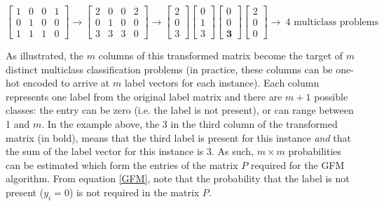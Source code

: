 \documentclass[fleqn]{homework}
\begin{document}
\begin{equation}
\begin{bmatrix}
1 & 0 & 0 & 1 \\
0 & 1 & 0 & 0 \\
1 & 1 & 1 & 0 
\end{bmatrix}
\rightarrow
\begin{bmatrix}
2 & 0 & 0 & 2 \\
0 & 1 & 0 & 0 \\
3 & 3 & 3 & 0 
\end{bmatrix}
\rightarrow
\begin{bmatrix}
2 \\
0 \\
3   
\end{bmatrix}
\begin{bmatrix}
0 \\
1 \\
3   
\end{bmatrix}
\begin{bmatrix}
0 \\
0 \\
\mathbf{3}   
\end{bmatrix}
\begin{bmatrix}
2 \\
0 \\
0   
\end{bmatrix}
\rightarrow
\ \text{4 multiclass problems}
\end{equation}

As illustrated, the $m$ columns of this transformed matrix become the target of $m$ distinct multiclass classification problems (in practice, these columns can be one-hot encoded to arrive at $m$ label vectors for each instance). Each column represents one label from the original label matrix and there are $m+1$ possible classes: the entry can be zero (i.e. the label is not present), or can range between 1 and $m$. In the example above, the 3 in the third column of the transformed matrix (in bold), means that the third label is present for this instance \textit{and} that the sum of the label vector for this instance is 3. As such, $m \times m$ probabilities can be estimated which form the entries of the matrix $P$ required for the GFM algorithm. From equation \ref{GFM}, note that the probability that the label is not present ($y_i =0$) is not required in the matrix $P$.
\end{document}
